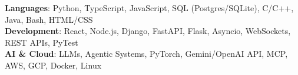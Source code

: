 \begin{itemize}[leftmargin=0.15in, label={}]
    \small{\item{
     \textbf{Languages}{: Python, TypeScript, JavaScript, SQL (Postgres/SQLite), C/C++, Java, Bash, HTML/CSS} \\
     \textbf{Development}{: React, Node.js, Django, FastAPI, Flask, Asyncio, WebSockets, REST APIs, PyTest} \\
     \textbf{AI \& Cloud}{: LLMs, Agentic Systems, PyTorch, Gemini/OpenAI API, MCP, AWS, GCP, Docker, Linux}
    }}
\end{itemize}
